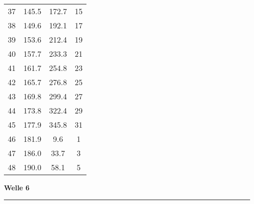 \documentclass[10pt, a4paper]{article}
\begin{document}
\begin{center}
\begin{tabular}{c|c|c|c}
		37 & 145.5 & 172.7 & 15 \\
		38 & 149.6 & 192.1 & 17 \\
		39 & 153.6 & 212.4 & 19 \\
		40 & 157.7 & 233.3 & 21 \\
		41 & 161.7 & 254.8 & 23 \\
		42 & 165.7 & 276.8 & 25 \\
		43 & 169.8 & 299.4 & 27 \\
		44 & 173.8 & 322.4 & 29 \\
		45 & 177.9 & 345.8 & 31 \\
		46 & 181.9 & 9.6 & 1 \\
		47 & 186.0 & 33.7 & 3 \\
		48 & 190.0 & 58.1 & 5 \\
	\end{tabular}
\end{center}
\newpage
\centerline{{\bf Welle 6} }
\rule{1.0\textwidth}{0.5mm}
\end{document}
